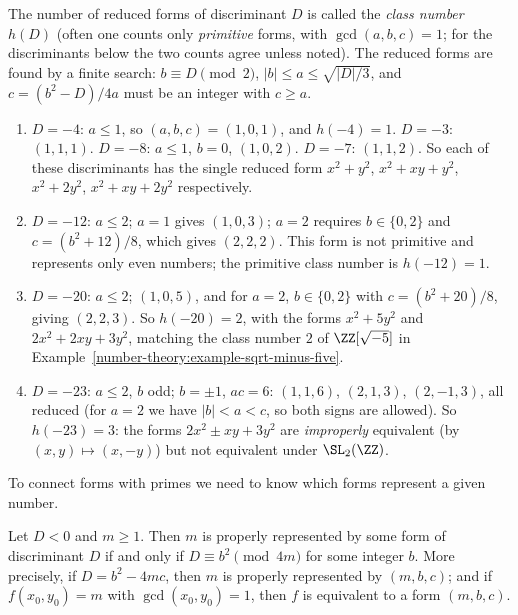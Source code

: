 The number of reduced forms of discriminant $D$ is called the \emph{class number} $h(D)$ (often one counts only \emph{primitive} forms, with $\gcd(a, b, c) = 1$; for the discriminants below the two counts
agree unless noted). The reduced forms are found by a finite search: $b \equiv D \pmod 2$, $|b| \leq a \leq \sqrt{|D|/3}$, and $c = (b^2 - D)/4a$ must be an integer with $c \geq a$.

\begin{example}\label{number-theory:example-reduced-forms}
\begin{enumerate}
\item $D = -4$: $a \leq 1$, so $(a, b, c) = (1, 0, 1)$, and $h(-4) = 1$. $D = -3$: $(1, 1, 1)$. $D = -8$: $a \leq 1$, $b = 0$, $(1, 0, 2)$. $D = -7$: $(1, 1, 2)$. So each of these discriminants has the single
reduced form $x^2 + y^2$, $x^2 + xy + y^2$, $x^2 + 2y^2$, $x^2 + xy + 2y^2$ respectively.
\item $D = -12$: $a \leq 2$; $a = 1$ gives $(1, 0, 3)$; $a = 2$ requires $b \in \{0, 2\}$ and $c = (b^2 + 12)/8$, which gives $(2, 2, 2)$. This form is not primitive and represents only even numbers;
the primitive class number is $h(-12) = 1$.
\item $D = -20$: $a \leq 2$; $(1, 0, 5)$, and for $a = 2$, $b \in \{0, 2\}$ with $c = (b^2 + 20)/8$, giving $(2, 2, 3)$. So $h(-20) = 2$, with the forms $x^2 + 5y^2$ and $2x^2 + 2xy + 3y^2$, matching the class
number $2$ of $\ZZ[\sqrt{-5}]$ in Example~\ref{number-theory:example-sqrt-minus-five}.
\item $D = -23$: $a \leq 2$, $b$ odd; $b = \pm1$, $ac = 6$: $(1, 1, 6)$, $(2, 1, 3)$, $(2, -1, 3)$, all reduced (for $a = 2$ we have $|b| < a < c$, so both signs are allowed). So $h(-23) = 3$: the forms
$2x^2 \pm xy + 3y^2$ are \emph{improperly} equivalent (by $(x, y) \mapsto (x, -y)$) but not equivalent under $\SL_2(\ZZ)$.
\end{enumerate}
\end{example}

To connect forms with primes we need to know which forms represent a given number.

\begin{lemma}\label{number-theory:lemma-representation}
Let $D < 0$ and $m \geq 1$. Then $m$ is properly represented by some form of discriminant $D$ if and only if $D \equiv b^2 \pmod{4m}$ for some integer $b$. More precisely, if $D = b^2 - 4mc$, then $m$ is
properly represented by $(m, b, c)$; and if $f(x_0, y_0) = m$ with $\gcd(x_0, y_0) = 1$, then $f$ is equivalent to a form $(m, b, c)$.
\end{lemma}

